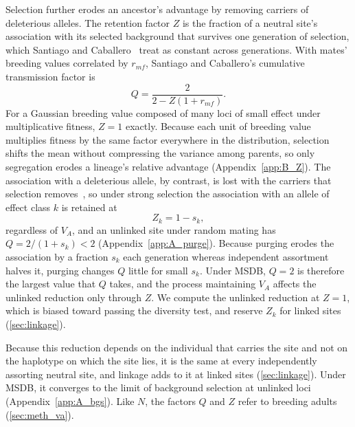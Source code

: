 \documentclass{article}
\begin{document}
Selection further erodes an ancestor's advantage by removing carriers of deleterious alleles. The retention factor $Z$ is the fraction of a neutral site's association with its selected background that survives one generation of selection, which Santiago and Caballero~\cite{santiago1995} treat as constant across generations. With mates' breeding values correlated by $r_{mf}$, Santiago and Caballero's cumulative transmission factor is
\begin{equation}
    Q = \frac{2}{2 - Z(1 + r_{mf})}. \label{eq:Q}
\end{equation}
For a Gaussian breeding value composed of many loci of small effect under multiplicative fitness, $Z = 1$ exactly. Because each unit of breeding value multiplies fitness by the same factor everywhere in the distribution, selection shifts the mean without compressing the variance among parents, so only segregation erodes a lineage's relative advantage (Appendix~\ref{app:B_Z}). The association with a deleterious allele, by contrast, is lost with the carriers that selection removes~\cite{nordborg1996,charlesworth2012}, so under strong selection the association with an allele of effect class $k$ is retained at
\begin{equation}
    Z_k = 1 - s_k, \label{eq:Z}
\end{equation}
regardless of $V_A$, and an unlinked site under random mating has $Q = 2/(1 + s_k) < 2$ (Appendix~\ref{app:A_purge}). Because purging erodes the association by a fraction $s_k$ each generation whereas independent assortment halves it, purging changes $Q$ little for small $s_k$. Under MSDB, $Q = 2$ is therefore the largest value that $Q$ takes, and the process maintaining $V_A$ affects the unlinked reduction only through $Z$. We compute the unlinked reduction at $Z = 1$, which is biased toward passing the diversity test, and reserve $Z_k$ for linked sites (\autoref{sec:linkage}).

Because this reduction depends on the individual that carries the site and not on the haplotype on which the site lies, it is the same at every independently assorting neutral site, and linkage adds to it at linked sites (\autoref{sec:linkage}). Under MSDB, it converges to the limit of background selection at unlinked loci (Appendix~\ref{app:A_bgs}). Like $N$, the factors $Q$ and $Z$ refer to breeding adults (\autoref{sec:meth_va}).
\end{document}
